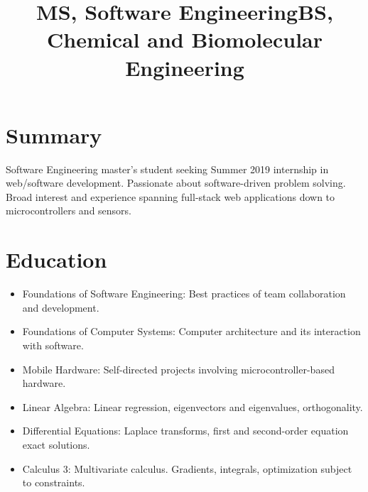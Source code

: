 \documentclass[12pt]{res} %
\begin{document}
    \begin{resume}
 
      \section{Summary}
      Software Engineering master's student seeking Summer 2019 internship in web/software development.
      Passionate about software-driven problem solving.
      Broad interest and experience spanning full-stack web applications down to microcontrollers and sensors.
      \vspace{-12pt}

      \section{Education}

          \title{\textbf{MS, Software Engineering}}
          \begin{position}
              \vspace{-14pt}
              \begin{itemize}[leftmargin=-0.4cm]
              \itemsep0em
              \item Foundations of Software Engineering: Best practices of team collaboration and development.
              \item Foundations of Computer Systems: Computer architecture and its interaction with software.
              \item Mobile Hardware: Self-directed projects involving microcontroller-based hardware.
              \end{itemize}
          \end{position}
          \vspace{-12pt}

          \title{\textbf{BS, Chemical and Biomolecular Engineering}}
          \begin{position}
            \vspace{-14pt}
            \begin{itemize}[leftmargin=-0.4cm]
            \itemsep0em
            \item Linear Algebra: Linear regression, eigenvectors and eigenvalues, orthogonality.
            \item Differential Equations: Laplace transforms, first and second-order equation exact solutions.
            \item Calculus 3: Multivariate calculus. Gradients, integrals, optimization subject to constraints.
            \end{itemize}
          \end{position}
          \vspace{-12pt}


\end{resume}
\end{document}
